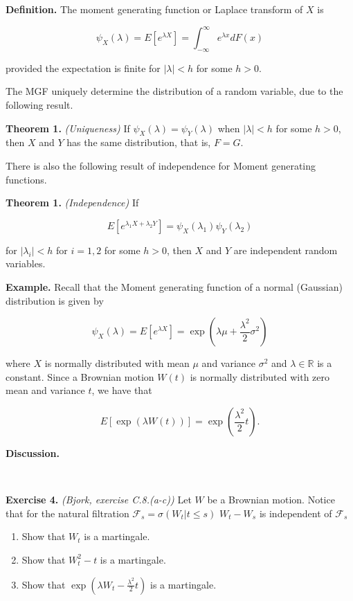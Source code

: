 \documentclass[
]{book}
\providecommand{\tightlist}{%
  \setlength{\itemsep}{0pt}\setlength{\parskip}{0pt}}
\begin{document}
\textbf{Definition.} The moment generating function or Laplace transform of \(X\) is

\[\psi_X(\lambda)=E\left[e^{\lambda X}\right]=\int_{-\infty}^\infty e^{\lambda x}dF(x)\]

provided the expectation is finite for \(\vert\lambda\vert<h\) for some \(h>0\).

The MGF uniquely determine the distribution of a random variable, due to the following result.

\textbf{Theorem 1.} \emph{(Uniqueness)} If \(\psi_X(\lambda)=\psi_Y(\lambda)\) when \(\vert\lambda\vert<h\) for some \(h>0\), then \(X\) and \(Y\) has the same distribution, that is, \(F=G\).

There is also the following result of independence for Moment generating functions.

\textbf{Theorem 1.} \emph{(Independence)} If

\[E\left[e^{\lambda_1X+\lambda_2Y}\right]=\psi_X(\lambda_1)\psi_Y(\lambda_2)\]

for \(\vert\lambda_i\vert<h\) for \(i=1,2\) for some \(h>0\), then \(X\) and \(Y\) are independent random variables.

\textbf{Example.} Recall that the Moment generating function of a normal (Gaussian) distribution is given by

\[\psi_X(\lambda)=E\left[e^{\lambda X}\right]=\exp\left(\lambda \mu + \frac{\lambda^2}{2}\sigma^2\right)\]

where \(X\) is normally distributed with mean \(\mu\) and variance \(\sigma^2\) and \(\lambda\in\mathbb{R}\) is a constant. Since a Brownian motion \(W(t)\) is normally distributed with zero mean and variance \(t\), we have that

\[E[\exp(\lambda W(t))]=\exp\left(\frac{\lambda^2}{2}t\right).\]

\textbf{Discussion.}

~

\textbf{Exercise 4.} \emph{(Bjork, exercise C.8.(a-c))} Let \(W\) be a Brownian motion. Notice that for the natural filtration \(\mathcal{F}_s=\sigma(W_t\vert t\le s)\) \(W_t-W_s\) is independent of \(\mathcal{F}_s\)

\begin{enumerate}
\def\labelenumi{\alph{enumi}.}
\tightlist
\item
  Show that \(W_t\) is a martingale.
\item
  Show that \(W^2_t-t\) is a martingale.
\item
  Show that \(\exp(\lambda W_t-\frac{\lambda^2}{2}t)\) is a martingale.
\end{enumerate}
\end{document}
